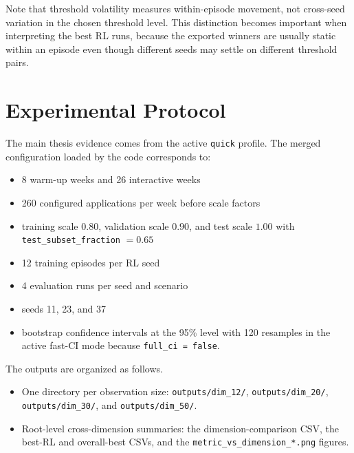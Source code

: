 \documentclass[12pt,a4paper]{article}
\begin{document}
Note that threshold volatility measures within-episode movement, not cross-seed variation in the chosen threshold level. This distinction becomes important when interpreting the best RL runs, because the exported winners are usually static within an episode even though different seeds may settle on different threshold pairs.

\section{Experimental Protocol}

The main thesis evidence comes from the active \texttt{quick} profile. The merged configuration loaded by the code corresponds to:
\begin{itemize}[leftmargin=*]
    \item 8 warm-up weeks and 26 interactive weeks
    \item 260 configured applications per week before scale factors
    \item training scale $0.80$, validation scale $0.90$, and test scale $1.00$ with \texttt{test\_subset\_fraction} $= 0.65$
    \item 12 training episodes per RL seed
    \item 4 evaluation runs per seed and scenario
    \item seeds 11, 23, and 37
    \item bootstrap confidence intervals at the 95\% level with 120 resamples in the active fast-CI mode because \texttt{full\_ci = false}.
\end{itemize}

The outputs are organized as follows.
\begin{itemize}[leftmargin=*]
    \item One directory per observation size: \texttt{outputs/dim\_12/}, \texttt{outputs/dim\_20/}, \texttt{outputs/dim\_30/}, and \texttt{outputs/dim\_50/}.
    \item Root-level cross-dimension summaries: the dimension-comparison CSV, the best-RL and overall-best CSVs, and the \texttt{metric\_vs\_dimension\_*.png} figures.
\end{itemize}
\end{document}
